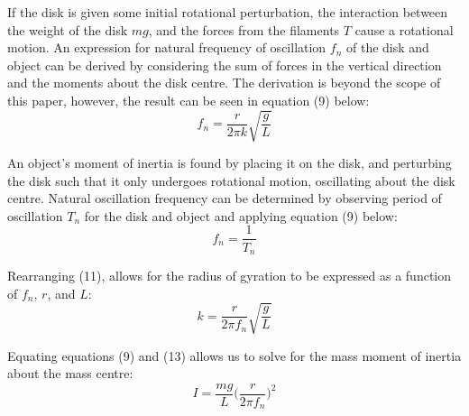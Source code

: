 \documentclass[a4paper]{article}
\begin{document}
If the disk is given some initial rotational perturbation, the interaction between the weight of the disk $mg$, and the forces from the filaments $T$ cause a rotational motion. An expression for natural frequency of oscillation $f_n$ of the disk and object can be derived by considering the sum of forces in the vertical direction and the moments about the disk centre. The derivation is beyond the scope of this paper, however, the result can be seen in equation (9) below:
\begin{equation}
f_n = \frac{r}{2 \pi k} \sqrt{\frac{g}{L}}
\end{equation}

An object's moment of inertia is found by placing it on the disk, and perturbing the disk such that it only undergoes rotational motion, oscillating about the disk centre. Natural oscillation frequency can be determined by observing period of oscillation $T_n$ for the disk and object and applying equation (9) below:
\begin{equation}
f_n = \frac{1}{T_n}
\end{equation}

Rearranging (11), allows for the radius of gyration to be expressed as a function of $f_n$, $r$, and $L$:
\begin{equation}
k = \frac{r}{2 \pi f_n} \sqrt{\frac{g}{L}}
\end{equation}

Equating equations (9) and (13) allows us to solve for the mass moment of inertia about the mass centre:
\begin{equation}
	I = \frac{mg}{L} \bigg( \frac{r}{2 \pi f_n} \bigg)^2
\end{equation}

\newpage
\end{document}
